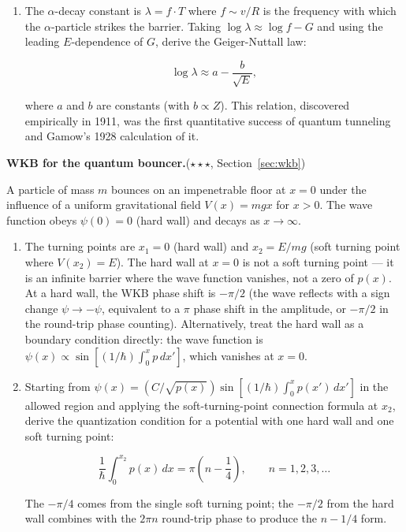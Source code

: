 \begin{problemset}
\begin{enumerate}
\item[(d)] The $\alpha$-decay constant is $\lambda = f \cdot T$ where $f \sim v/R$ is the frequency with which the $\alpha$-particle strikes the barrier. Taking $\log\lambda \approx \log f - G$ and using the leading $E$-dependence of $G$, derive the Geiger-Nuttall law:
\begin{linenomath}
\begin{equation}
\log\lambda \approx a - \frac{b}{\sqrt{E}},
\end{equation}
\end{linenomath}
where $a$ and $b$ are constants (with $b \propto Z$). This relation, discovered empirically in 1911, was the first quantitative success of quantum tunneling and Gamow's 1928 calculation of it.
\end{enumerate}

\item[10.] \textbf{WKB for the quantum bouncer.}\quad($\star\star\star$, Section~\ref{sec:wkb})

A particle of mass $m$ bounces on an impenetrable floor at $x=0$ under the influence of a uniform gravitational field $V(x) = mgx$ for $x > 0$. The wave function obeys $\psi(0) = 0$ (hard wall) and decays as $x \to \infty$.

\begin{enumerate}
\item[(a)] The turning points are $x_1 = 0$ (hard wall) and $x_2 = E/mg$ (soft turning point where $V(x_2) = E$). The hard wall at $x=0$ is not a soft turning point --- it is an infinite barrier where the wave function vanishes, not a zero of $p(x)$. At a hard wall, the WKB phase shift is $-\pi/2$ (the wave reflects with a sign change $\psi \to -\psi$, equivalent to a $\pi$ phase shift in the amplitude, or $-\pi/2$ in the round-trip phase counting). Alternatively, treat the hard wall as a boundary condition directly: the wave function is $\psi(x) \propto \sin[(1/\hbar)\int_0^x p\,dx']$, which vanishes at $x=0$.

\item[(b)] Starting from $\psi(x) = (C/\sqrt{p(x)})\sin[(1/\hbar)\int_0^x p(x')\,dx']$ in the allowed region and applying the soft-turning-point connection formula at $x_2$, derive the quantization condition for a potential with one hard wall and one soft turning point:
\begin{linenomath}
\begin{equation}
\frac{1}{\hbar}\int_0^{x_2} p(x)\,dx = \pi\left(n - \frac{1}{4}\right), \qquad n = 1,2,3,\ldots
\end{equation}
\end{linenomath}
The $-\pi/4$ comes from the single soft turning point; the $-\pi/2$ from the hard wall combines with the $2\pi n$ round-trip phase to produce the $n-1/4$ form.


\end{enumerate}
\end{problemset}
